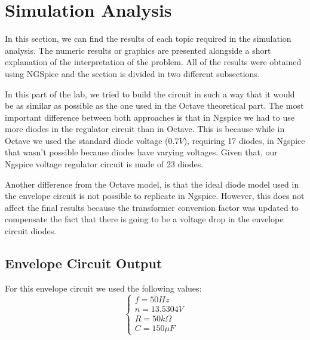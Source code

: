 \section{Simulation Analysis}
\label{sec:simulation}

In this section, we can find the results of each topic required in the simulation analysis. The numeric results or graphics are presented alongside a short explanation of the interpretation of the problem. All of the results were obtained using NGSpice and the section is divided in two different subsections. 

In this part of the lab, we tried to build the circuit in such a way that it would be as similar as possible as the one used in the Octave theoretical part. The most important difference between both approaches is that in Ngspice we had to use more diodes in the regulator circuit than in Octave. This is because while in Octave we used the standard diode voltage ($0.7 V$), requiring 17 diodes, in Ngspice that wasn't possible because diodes have varying voltages. Given that, our Ngspice voltage regulator circuit is made of 23 diodes.

Another difference from the Octave model, is that the ideal diode model used in the envelope circuit is not possible to replicate in Ngspice. However, this does not affect the final results because the transformer conversion factor was updated to compensate the fact that there is going to be a voltage drop in the envelope circuit diodes.

\subsection{Envelope Circuit Output}


For this envelope circuit we used the following values:
\[
\left\{\begin{matrix}
f = 50 Hz\\
n=13.5304 V\\
R=50k\Omega\\
C=150 \mu F
\end{matrix}\right.
\]

